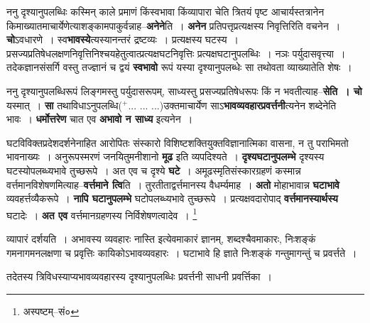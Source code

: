 \documentclass[article,12pt,a4paper]{memoir}
\newcommand{\add}[1]{($^{+}$#1)}
\begin{document}
	  \endgroup
	

	  \pstart ननु दृश्यानुपलब्धिः कस्मिन् काले प्रमाणं किंस्वभावा किंव्यापारा चेति त्रितयं पृष्ट आचार्यस्तत्रानेन किमाख्यातमाचार्येणेत्याशङ्कामपाकुर्वन्नाह--\textbf{अनेने}ति । \textbf{अनेन} प्रतिपत्तृप्रत्यक्षस्य निवृत्तिरिति वचनेन । \textbf{चो}ऽवधारणे । स्व\textbf{भावस्ये}त्यस्यानन्तरं द्रष्टव्यः । प्रत्यक्षस्य घटस्य । प्रसज्यप्रतिषेधलक्षणनिवृत्तिनिश्चयहेतुत्वात्प्रत्यक्षघटनिवृत्तिः प्रत्यक्षघटानुपलब्धिः । नञः पर्युदासवृत्त्या । तदेकज्ञानसंसर्गि वस्तु तज्ज्ञानं च द्वयं \textbf{स्वभावो} रूपं यस्या दृश्यानुपलब्धेः सा तथोवता व्याख्यातेति शेषः ।
	\pend
      

	  \pstart ननु दृश्यानुपलब्धिरूपं लिङ्गमस्तु पर्युदासरूपम्, साध्यस्तु प्रसज्यप्रतिषेधरूपः किं न भवतीत्याह--\textbf{सेति । चो} यस्मात् । \textbf{सा} तथाविधाऽनुपलब्धि\add{... ... ...}उक्तमाचार्येण साऽ\textbf{भावव्यवहारप्रवर्त्तनी}त्यनेन शब्देनेति भावः । \textbf{धर्मोत्तरेण} चात एव \textbf{अभावो न साध्य} इत्यनेन ।
	\pend
      

	  \pstart घटविविक्तप्र\leavevmode{}देशदर्शनेनाहित आरोपितः संस्कारो विशिष्टशक्तियुक्तविज्ञानात्मिका वासना, न तु पराभिमतो भावनाख्यः । अनुरूपस्मरणं जनयितुमनीशानो \textbf{मूढ} इति व्यपदिश्यते । \textbf{दृश्यघटानुपलम्भे} दृश्यस्य घटस्योपलब्ध्यभावे तुच्छरूपे । अत एव च दृश्ये \textbf{घटे} । अमूढस्मृतिसंस्कारग्रहणं कस्मान्न वर्त्तमानविशेषणमित्याह--\textbf{वर्त्तमाने त्वि}ति । तुरतीताद्वर्त्तमानस्य वैधर्म्यमाह । \textbf{अतो} मोहाभावान्न \textbf{घटाभावे} व्यवहर्त्तव्यैकरूपे । \textbf{नापि घटानुपलम्भे} घटोपलब्ध्यभावे तुच्छरूपे । प्रत्यक्षवदारोपाद् \textbf{वर्त्तमानस्यार्थस्य} घटादेः । \textbf{अत एव} वर्त्तमानग्रहणस्य निर्विशेषणत्वादेव ।
	\pend
      \footnote{अस्पष्टम्--सं०}
	  \bigskip
	  \begingroup
	

	  \pstart व्यापारं दर्शयति । अभावस्य व्यवहारः नास्ति इत्येवमाकारं ज्ञानम्, शब्दश्चैवमाकारः, निःशङ्कं गमनागमनलक्षणा च प्रवृत्तिः कायिकोऽभावव्यवहारः । घटाभावे हि ज्ञाते निःशङ्कं गन्तुमागन्तुं च प्रवर्त्तते ।
	\pend
        

	  \pstart {}तदेतस्य त्रिविधस्याप्यभावव्यवहारस्य दृश्यानुपलब्धिः प्रवर्त्तनी साधनी प्रवर्त्तिका ।
	\pend
        
\end{document}
